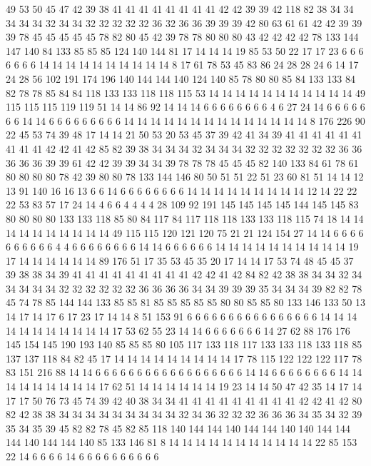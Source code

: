49 53 50 45 47 42 39 38 41 41 41 41 41 41 41 41 42 42 39 39
42 118 82 38 34 34 34 34 34 32 34 34 32 32 32 32 32 36 32 36
36 39 39 39 42 80 63 61 61 42 42 39 39 39 78 45 45 45 45 45
78 82 80 45 42 39 78 78 80 80 80 43 42 42 42 42 78 133 144 147
140 84 133 85 85 85 124 140 144 81 17 14 14 14 19 85 53 50 22 17
17 23 6 6 6 6 6 6 6 14 14 14 14 14 14 14 14 14 14 8
17 61 78 53 45 83 86 24 28 28 24 6 14 17 24 28 56 102 191 174
196 140 144 144 140 124 140 85 78 80 80 85 84 133 133 84 82 78 78 85
84 84 118 133 133 118 118 115 53 14 14 14 14 14 14 14 14 14 14 14
49 115 115 115 119 119 51 14 14 86 92 14 14 14 6 6 6 6 6 6
6 6 4 6 27 24 14 6 6 6 6 6 6 6 14 14 6 6 6 6
6 6 6 6 6 14 14 14 14 14 14 14 14 14 14 14 14 14 14 8
176 226 90 22 45 53 74 39 48 17 14 14 21 50 53 20 53 45 37 39
42 41 34 39 41 41 41 41 41 41 41 41 41 42 42 41 42 85 82 39
38 34 34 34 32 34 34 34 32 32 32 32 32 32 32 36 36 36 36 36
39 39 61 42 42 39 39 34 34 39 78 78 78 45 45 45 82 140 133 84
61 78 61 80 80 80 80 78 42 39 80 80 78 133 144 146 80 50 51 51
22 51 23 60 81 51 14 14 12 13 91 140 16 16 13 6 6 14 6 6
6 6 6 6 6 6 14 14 14 14 14 14 14 14 14 12 14 22 22 22
53 83 57 17 24 14 4 6 6 4 4 4 4 28 109 92 191 145 145 145
145 144 145 145 83 80 80 80 80 133 133 118 85 80 84 117 84 117 118 118
133 133 118 115 74 18 14 14 14 14 14 14 14 14 14 14 49 115 115 120
121 120 75 21 21 124 154 27 14 14 6 6 6 6 6 6 6 6 6 6
4 4 6 6 6 6 6 6 6 6 14 14 6 6 6 6 6 6 14 14
14 14 14 14 14 14 14 14 19 17 14 14 14 14 14 14 89 176 51 17
35 53 45 35 20 17 14 14 17 53 74 48 45 45 37 39 38 38 34 39
41 41 41 41 41 41 41 41 41 42 42 41 42 84 82 42 38 38 34 34
32 34 34 34 34 34 32 32 32 32 32 32 36 36 36 36 34 34 39 39
39 35 34 34 34 39 82 82 78 45 74 78 85 144 144 133 85 85 81 85
85 85 85 85 80 80 85 85 80 133 146 133 50 13 14 17 14 17 6 17
23 17 14 14 8 51 153 91 6 6 6 6 6 6 6 6 6 6 6 6
6 6 6 6 14 14 14 14 14 14 14 14 14 14 14 17 53 62 55 23
14 14 6 6 6 6 6 6 6 14 27 62 88 176 176 145 154 145 190 193
140 85 85 85 80 105 117 133 118 117 133 133 118 133 118 85 137 137 118 84
82 45 17 14 14 14 14 14 14 14 14 14 17 78 115 122 122 122 117 78
83 151 216 88 14 14 6 6 6 6 6 6 6 6 6 6 6 6 6 6
6 6 6 6 14 14 6 6 6 6 6 6 6 6 14 14 14 14 14 14
14 14 14 17 62 51 14 14 14 14 14 14 19 23 14 14 50 47 42 35
14 17 14 17 17 50 76 73 45 74 39 42 40 38 34 34 41 41 41 41
41 41 41 41 41 42 42 41 42 80 82 42 38 38 34 34 34 34 34 34
34 34 34 32 34 36 32 32 32 36 36 36 34 35 34 32 39 35 34 35
39 45 82 82 78 45 82 85 118 140 144 144 140 144 144 140 140 144 144 144
140 144 144 140 85 133 146 81 8 14 14 14 14 14 14 14 14 14 14 14
22 85 153 22 14 6 6 6 6 14 6 6 6 6 6 6 6 6 6 6
